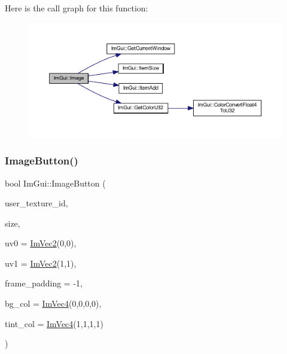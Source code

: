 Here is the call graph for this function\+:
\nopagebreak
\begin{figure}[H]
\begin{center}
\leavevmode
\includegraphics[width=350pt]{namespace_im_gui_ad8705ac3b718c1b2e84e7b8c34f90249_cgraph}
\end{center}
\end{figure}
\mbox{\label{namespace_im_gui_ac79ef64e8b9e1db73d8237f6a999da14}} 
\subsubsection{\texorpdfstring{Image\+Button()}{ImageButton()}}
{\footnotesize\ttfamily bool Im\+Gui\+::\+Image\+Button (\begin{DoxyParamCaption}\item[{\mbox{\hyperlink{imgui_8h_a364f4447ecbc4ca176145ccff9db6286}{Im\+Texture\+ID}}}]{user\+\_\+texture\+\_\+id,  }\item[{const \mbox{\hyperlink{struct_im_vec2}{Im\+Vec2}} \&}]{size,  }\item[{const \mbox{\hyperlink{struct_im_vec2}{Im\+Vec2}} \&}]{uv0 = {\ttfamily \mbox{\hyperlink{struct_im_vec2}{Im\+Vec2}}(0,0)},  }\item[{const \mbox{\hyperlink{struct_im_vec2}{Im\+Vec2}} \&}]{uv1 = {\ttfamily \mbox{\hyperlink{struct_im_vec2}{Im\+Vec2}}(1,1)},  }\item[{int}]{frame\+\_\+padding = {\ttfamily -\/1},  }\item[{const \mbox{\hyperlink{struct_im_vec4}{Im\+Vec4}} \&}]{bg\+\_\+col = {\ttfamily \mbox{\hyperlink{struct_im_vec4}{Im\+Vec4}}(0,0,0,0)},  }\item[{const \mbox{\hyperlink{struct_im_vec4}{Im\+Vec4}} \&}]{tint\+\_\+col = {\ttfamily \mbox{\hyperlink{struct_im_vec4}{Im\+Vec4}}(1,1,1,1)} }\end{DoxyParamCaption})}

